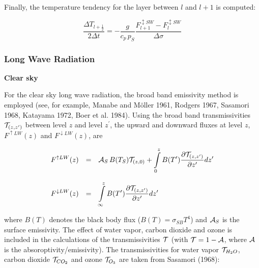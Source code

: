 Finally, the temperature tendency for the layer between
$l$ and $l+1$ is computed:

\begin{equation}
\frac{\Delta T_{l+\frac{1}{2}}}{2\Delta t} = -
\frac{g}{c_p
\, p_S}\frac{F_{l+1}^{\updownarrow SW}-F_{l}^{\updownarrow SW}}{\Delta
\sigma}   
\end{equation}

\newpage

\subsubsection{Long Wave Radiation}

{\bf Clear sky}

For the clear sky long wave radiation, the broad band
emissivity method is employed (see, for example,
Manabe and M\"oller 1961, Rodgers 1967, Sasamori
1968, Katayama 1972, Boer et al. 1984).
Using the broad band transmissivities
${\cal T}_{(z,z^{\prime})}$ between level $z$ and level
$z^{\prime}$, the upward and downward fluxes at
level
$z$, $F^{\uparrow LW}(z)$ and
$F^{\downarrow LW}(z)$, are

\begin{equation}
\begin{array}{rcl}
\displaystyle F^{\uparrow LW}(z) & = &\displaystyle  {\cal A}_S \, B(T_S)
{\cal T}_{(z,0)} +
\int\limits_0^z B(T^{\prime}) \frac{\partial
{\cal T}_{(z,z^{\prime})}}{\partial z^{\prime}} d z^{\prime}
\\
& & \\
\displaystyle F^{\downarrow LW}(z) & = & \displaystyle \int\limits_{\infty}^z
B(T^{\prime}) \frac{\partial
{\cal T}_{(z,z^{\prime})}}{\partial z^{\prime}} d z^{\prime} 
\end{array}
\end{equation}


where $B(T)$ denotes the black body flux ($ B(T) = \sigma_{SB}
T^4$) and
${\cal A}_S$ is the surface emissivity. The effect
of water vapor, carbon dioxide and ozone is included in the
calculations of the transmissivities ${\cal T}$
(with ${\cal T} = 1 - {\cal A}$, where ${\cal A}$ is the
absoroptivity/emissivity). The transmissivities for water vapor 
${\cal T}_{H_2O}$, carbon dioxide ${\cal T}_{CO_2}$ and 
ozone ${\cal T}_{O_3}$ are taken from Sasamori (1968):

